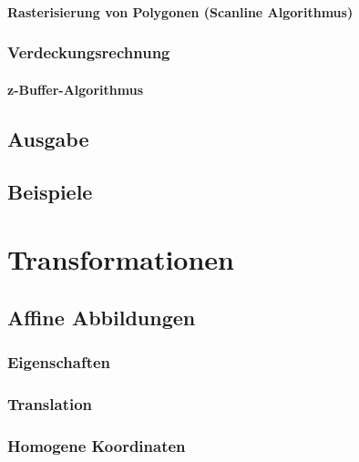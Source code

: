 \documentclass[a4paper, 11pt, accentcolor = tud3b]{tudreport}
\begin{document}
				\subsubsection{Rasterisierung von Polygonen (Scanline Algorithmus)} %

			\subsection{Verdeckungsrechnung} %

				\subsubsection{z-Buffer-Algorithmus} %

		\section{Ausgabe} %

		\section{Beispiele} %

	\chapter{Transformationen} %

		\section{Affine Abbildungen} %

			\subsection{Eigenschaften} %

			\subsection{Translation} %

			\subsection{Homogene Koordinaten} %
\end{document}

